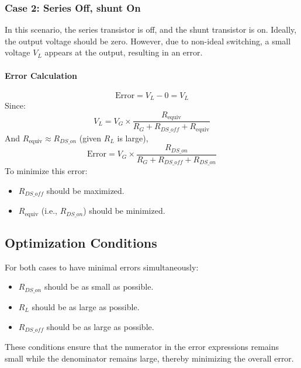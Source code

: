 \documentclass[a4paper,9pt,twoside,openany,twocolumn]{memoir}
\begin{document}
\subsubsection{Case 2: Series Off, shunt On}
In this scenario, the series transistor is off, and the shunt transistor is on. Ideally, the output voltage should be zero. However, due to non-ideal switching, a small voltage \( V_L \) appears at the output, resulting in an error.

\paragraph{Error Calculation}
\[
\text{Error} = V_L - 0 = V_L
\]
Since:
\[
V_L = V_G \times \frac{R_{\text{equiv}}}{R_G + R_{DS\_off} + R_{\text{equiv}}}
\]
And \( R_{\text{equiv}} \approx R_{DS\_on} \) (given \( R_L \) is large),
\[
\text{Error} = V_G \times \frac{R_{DS\_on}}{R_G + R_{DS\_off} + R_{DS\_on}}
\]
To minimize this error:
\begin{itemize}
    \item \( R_{DS\_off} \) should be maximized.
    \item \( R_{\text{equiv}} \) (i.e., \( R_{DS\_on} \)) should be minimized.
\end{itemize}

\subsection{Optimization Conditions}
For both cases to have minimal errors simultaneously:
\begin{itemize}
    \item \( R_{DS\_on} \) should be as small as possible.
    \item \( R_L \) should be as large as possible.
    \item \( R_{DS\_off} \) should be as large as possible.
\end{itemize}
These conditions ensure that the numerator in the error expressions remains small while the denominator remains large, thereby minimizing the overall error.
\end{document}
